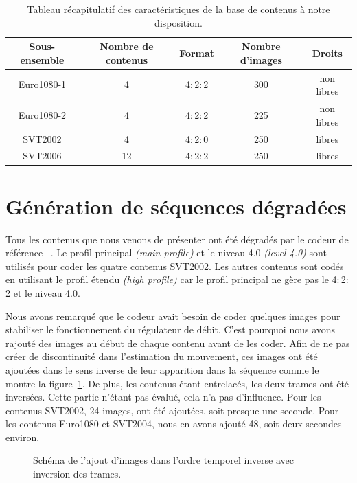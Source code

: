 \begin{table}[htbp]
\centering
\begin{tabular}{ccccc}\toprule
\textbf{Sous-ensemble}	& \textbf{Nombre de contenus}	& \textbf{Format}	& \textbf{Nombre d'images} 	& \textbf{Droits}	\\\toprule
Euro1080-1 						& 4 												& 4$:$2$:$2 			& 300 										& non libres\\\midrule
Euro1080-2						& 4 												& 4$:$2$:$2 			& 225 										& non libres\\\midrule
SVT2002							& 4 												& 4$:$2$:$0 			& 250 										& libres\\\midrule
SVT2006							& 12 											& 4$:$2$:$2 			& 250 										& libres \\\bottomrule
\end{tabular}
\caption{Tableau récapitulatif des caractéristiques de la base de contenus à notre disposition.}
\label{tab:baseContenus}
\end{table}


\section{Génération de séquences dégradées}
Tous les contenus que nous venons de présenter ont été dégradés par le codeur de référence \avc~\cite{h264-jm}. Le profil principal \emph{(main profile)} et le niveau 4.0 \emph{(level 4.0)} sont utilisés pour coder les quatre contenus SVT2002. Les autres contenus sont codés en utilisant le profil étendu \emph{(high profile)} car le profil principal ne gère pas le 4$:$2$:$2 et le niveau 4.0.

Nous avons remarqué que le codeur avait besoin de coder quelques images pour stabiliser le fonctionnement du régulateur de débit. C'est pourquoi nous avons rajouté des images au début de chaque contenu avant de les coder. Afin de ne pas créer de discontinuité dans l'estimation du mouvement, ces images ont été ajoutées dans le sens inverse de leur apparition dans la séquence comme le montre la figure~\ref{fig:inversionImages}. De plus, les contenus étant entrelacés, les deux trames ont été inversées. Cette partie n'étant pas évalué, cela n'a pas d'influence. Pour les contenus SVT2002, 24 images, ont été ajoutées, soit presque une seconde. Pour les contenus Euro1080 et SVT2004, nous en avons ajouté 48, soit deux secondes environ.

\begin{figure}[htbp]
	\centering
	
	\caption{Schéma de l'ajout d'images dans l'ordre temporel inverse avec inversion des trames.}
	\label{fig:inversionImages}
\end{figure}


